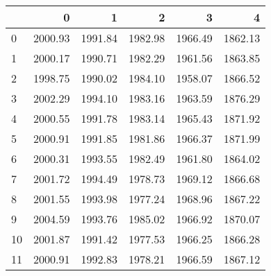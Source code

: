 \begin{tabular}{lrrrrr}
\toprule
{} &        0 &        1 &        2 &        3 &        4 \\
\midrule
0  &  2000.93 &  1991.84 &  1982.98 &  1966.49 &  1862.13 \\
1  &  2000.17 &  1990.71 &  1982.29 &  1961.56 &  1863.85 \\
2  &  1998.75 &  1990.02 &  1984.10 &  1958.07 &  1866.52 \\
3  &  2002.29 &  1994.10 &  1983.16 &  1963.59 &  1876.29 \\
4  &  2000.55 &  1991.78 &  1983.14 &  1965.43 &  1871.92 \\
5  &  2000.91 &  1991.85 &  1981.86 &  1966.37 &  1871.99 \\
6  &  2000.31 &  1993.55 &  1982.49 &  1961.80 &  1864.02 \\
7  &  2001.72 &  1994.49 &  1978.73 &  1969.12 &  1866.68 \\
8  &  2001.55 &  1993.98 &  1977.24 &  1968.96 &  1867.22 \\
9  &  2004.59 &  1993.76 &  1985.02 &  1966.92 &  1870.07 \\
10 &  2001.87 &  1991.42 &  1977.53 &  1966.25 &  1866.28 \\
11 &  2000.91 &  1992.83 &  1978.21 &  1966.59 &  1867.12 \\
\bottomrule
\end{tabular}
